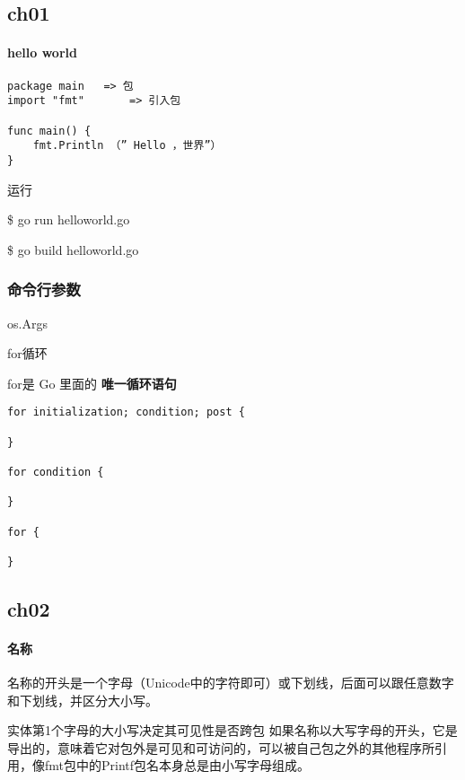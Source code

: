 \hypertarget{ch01}{%
\subsection{ch01}\label{ch01}}

\hypertarget{hello-world}{%
\paragraph{hello world}\label{hello-world}}

\begin{verbatim}
package main   => 包
import "fmt"       => 引入包

func main() { 
    fmt.Println （” Hello ，世界”）
}
\end{verbatim}

运行

\$ go run helloworld.go

\$ go build helloworld.go

\hypertarget{ux547dux4ee4ux884cux53c2ux6570}{%
\subsubsection{命令行参数}\label{ux547dux4ee4ux884cux53c2ux6570}}

os.Args

for循环

for是 Go 里面的 \textbf{唯一循环语句}

\begin{verbatim}
for initialization; condition; post { 

}

for condition {
    
}

for {
    
}
\end{verbatim}

\hypertarget{ch02}{%
\subsection{ch02}\label{ch02}}

\hypertarget{ux540dux79f0}{%
\paragraph{名称}\label{ux540dux79f0}}

名称的开头是一个字母（Unicode中的字符即可）或下划线，后面可以跟任意数字和下划线，并区分大小写。

实体第1个字母的大小写决定其可见性是否跨包
如果名称以大写字母的开头，它是导出的，意味着它对包外是可见和可访问的，可以被自己包之外的其他程序所引用，像fmt包中的Printf包名本身总是由小写字母组成。

